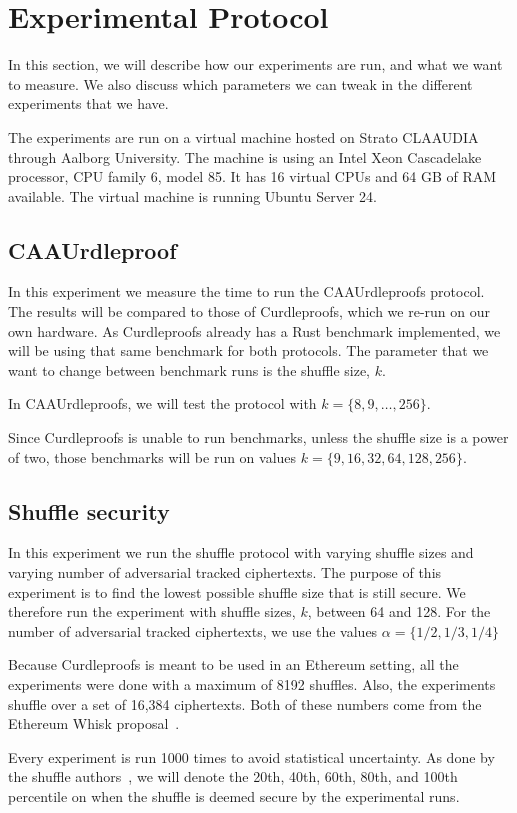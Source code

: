 
\section{Experimental Protocol}\label{sec:experimental-protocol}
In this section, we will describe how our experiments are run, and what we want to measure.
We also discuss which parameters we can tweak in the different experiments that we have.

The experiments are run on a virtual machine hosted on Strato CLAAUDIA through Aalborg University.
The machine is using an Intel Xeon Cascadelake processor, CPU family 6, model 85.
It has 16 virtual CPUs and 64 GB of RAM available.
The virtual machine is running Ubuntu Server 24.


\subsection{CAAUrdleproof}\label{sec:CAAUrdleproof-experiment}
In this experiment we measure the time to run the CAAUrdleproofs protocol.
The results will be compared to those of Curdleproofs, which we re-run on our own hardware.
As Curdleproofs already has a Rust benchmark implemented, we will be using that same benchmark for both protocols.
The parameter that we want to change between benchmark runs is the shuffle size, $k$.

In CAAUrdleproofs, we will test the protocol with $k=\{8,9,\dots,256\}$.

Since Curdleproofs is unable to run benchmarks, unless the shuffle size is a power of two, those benchmarks will be run on values $k=\{9,16,32,64,128,256\}$.




\subsection{Shuffle security}\label{subsec:experimental-protocol-shuffle-security}
In this experiment we run the shuffle protocol with varying shuffle sizes and varying number of adversarial tracked ciphertexts.
The purpose of this experiment is to find the lowest possible shuffle size that is still secure.
We therefore run the experiment with shuffle sizes, $k$, between 64 and 128.
For the number of adversarial tracked ciphertexts, we use the values $\alpha=\{1/2,1/3,1/4\}$

Because Curdleproofs is meant to be used in an Ethereum setting, all the experiments were done with a maximum of 8192 shuffles.
Also, the experiments shuffle over a set of 16,384 ciphertexts.
Both of these numbers come from the Ethereum Whisk proposal~\cite{Whisk2024}.


Every experiment is run 1000 times to avoid statistical uncertainty.
As done by the shuffle authors~\cite{cryptoeprint:2022/560}, we will denote the 20th, 40th, 60th, 80th, and 100th percentile on when the shuffle is deemed secure by the experimental runs.

